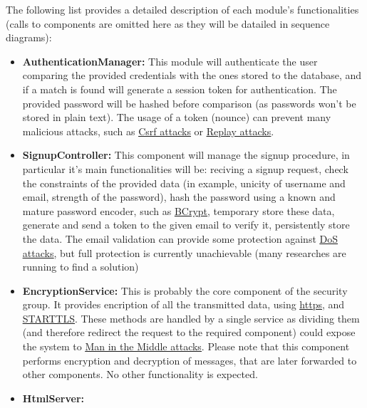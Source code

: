 \documentclass{article}
\newcommand{\link}[2]{{\color{blue}\underline{\href{#1}{#2}}}}
\begin{document}
	The following list provides a detailed description of each module's functionalities (calls to components are omitted here as they will be
	datailed in sequence diagrams):
	\begin{itemize}
		\item \label{component:AuthenticationManager} \textbf{AuthenticationManager:}
			This module will authenticate the user comparing the provided credentials with the ones stored to the database, and if a match is found
			will generate a session token for authentication. The provided password will be hashed before comparison (as passwords won't be stored
			in plain text). The usage of a token (nounce) can prevent many malicious attacks, such as 
		 	\link{https://en.wikipedia.org/wiki/Cross-site_request_forgery}{Csrf attacks} or 
			\link{https://en.wikipedia.org/wiki/Replay_attack}{Replay attacks}. 
		 \item \label{component:SignupController} \textbf{SignupController:} 
		 	This component will manage the signup procedure, in particular it's main functionalities will be: reciving a signup request, check the
		 	constraints of the provided data (in example, unicity of username and email, strength of the password), hash the password using a known
		 	and mature password encoder, such as \link{https://en.wikipedia.org/wiki/Bcrypt}{BCrypt}, temporary store these data, generate and send a
		 	token to the given email to verify it, persistently store the data. The email validation can provide some protection against
		 	\link{https://en.wikipedia.org/wiki/Denial-of-service_attack}{DoS attacks}, but full protection is
		 	currently unachievable (many researches are running to find a solution)
		 \item \label{component:EncryptionService} \textbf{EncryptionService:}
		 	This is probably the core component of the security group. It provides encription of all the transmitted data, using 
		 	 \link{https://en.wikipedia.org/wiki/HTTPS}{https}, and \link{https://en.wikipedia.org/wiki/Opportunistic_TLS}{STARTTLS}. 
		 	These methods are handled by a single service as dividing them (and therefore redirect the request to the required component) could
		 	expose the system to \link{https://en.wikipedia.org/wiki/Man-in-the-middle_attack}{Man in the Middle attacks}. 
		 	Please note that this component performs encryption and decryption of messages, that are later forwarded to other components. 
		 	No other functionality is expected.
		 \item \label{component:HtmlServer} \textbf{HtmlServer:}

\end{itemize}
\end{document}

